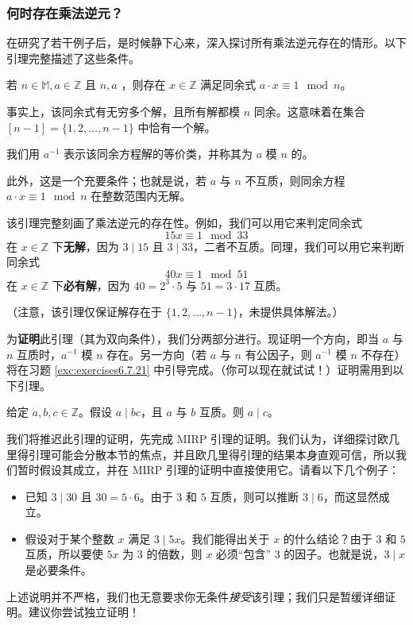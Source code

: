 \subsubsection*{何时存在乘法逆元？}

在研究了若干例子后，是时候静下心来，深入探讨所有乘法逆元存在的情形。以下引理完整描述了这些条件。

\begin{lemma}\label{lemma6.5.24}
    若 $n \in \mathbb{M}, a \in \mathbb{Z}$ 且 $n, a$ ，则存在 $x \in \mathbb{Z}$ 满足同余式 $a \cdot x \equiv 1 \mod n$。

    事实上，该同余式有无穷多个解，且所有解都模 $n$ 同余。这意味着在集合 $[n - 1] = \{1, 2, \dots, n-1\}$ 中恰有一个解。

    我们用 $a^{-1}$ 表示该同余方程解的等价类，并称其为 $a$ 模 $n$ 的。

    此外，这是一个充要条件；也就是说，若 $a$ 与 $n$ 不互质，则同余方程 $a \cdot x \equiv 1 \mod n$ 在整数范围内无解。
\end{lemma}

该引理完整刻画了乘法逆元的存在性。例如，我们可以用它来判定同余式
\[15x \equiv 1 \mod 33\]
在 $x \in \mathbb{Z}$ 下\textbf{无解}，因为 $3 \mid 15$ 且 $3 \mid 33$，二者不互质。同理，我们可以用它来判断同余式
\[40x \equiv 1 \mod 51\]
在 $x \in \mathbb{Z}$ 下\textbf{必有解}，因为 $40 = 2^3 \cdot 5$ 与 $51 = 3 \cdot 17$ 互质。

（注意，该引理仅保证解存在于 $\{1, 2, \dots , n-1\}$，未提供具体解法。）

为\textbf{证明}此引理（其为双向条件），我们分两部分进行。现证明一个方向，即当 $a$ 与 $n$ 互质时，$a^{-1}$ 模 $n$ 存在。另一方向（若 $a$ 与 $n$ 有公因子，则 $a^{-1}$ 模 $n$ 不存在）将在习题 \ref{exc:exercises6.7.21} 中引导完成。（你可以现在就试试！）证明需用到以下引理。

\begin{lemma}[欧几里得引理]\label{lemma6.5.25}
    给定 $a, b, c \in \mathbb{Z}$。假设 $a \mid bc$，且 $a$ 与 $b$ 互质。则 $a \mid c$。
\end{lemma}

我们将推迟此引理的证明，先完成 MIRP 引理的证明。我们认为，详细探讨欧几里得引理可能会分散本节的焦点，并且欧几里得引理的结果本身直观可信，所以我们暂时假设其成立，并在 MIRP 引理的证明中直接使用它。请看以下几个例子：
\begin{itemize}
    \item 已知 $3 \mid 30$ 且 $30 = 5 \cdot 6$。由于 $3$ 和 $5$ 互质，则可以推断 $3 \mid 6$，而这显然成立。
    \item 假设对于某个整数 $x$ 满足 $3 \mid 5x$。我们能得出关于 $x$ 的什么结论？由于 $3$ 和 $5$ 互质，所以要使 $5x$ 为 $3$ 的倍数，则 $x$ 必须``包含'' $3$ 的因子。也就是说，$3 \mid x$ 是必要条件。
\end{itemize}
上述说明并不严格，我们也无意要求你无条件\emph{接受}该引理；我们只是暂缓详细证明。建议你尝试独立证明！

